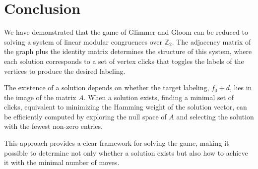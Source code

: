 \documentclass{article}
\begin{document}
\section{Conclusion}

We have demonstrated that the game of Glimmer and Gloom can be reduced to solving a system of linear modular congruences over \( \mathbb{Z}_2 \). The adjacency matrix of the graph plus the identity matrix determines the structure of this system, where each solution corresponds to a set of vertex clicks that toggles the labels of the vertices to produce the desired labeling.

The existence of a solution depends on whether the target labeling, \( f_0 + d \), lies in the image of the matrix \( A \). When a solution exists, finding a minimal set of clicks, equivalent to minimizing the Hamming weight of the solution vector, can be efficiently computed by exploring the null space of \( A \) and selecting the solution with the fewest non-zero entries.

This approach provides a clear framework for solving the game, making it possible to determine not only whether a solution exists but also how to achieve it with the minimal number of moves.
\end{document}
